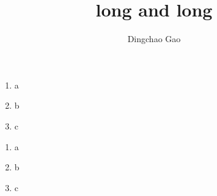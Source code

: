 \documentclass[18 pt]{beamer}
\title[short]{long and long}
\author[Gcc]{Dingchao Gao}
\institute[ISCAS]{Institute of Software Chinese Academy of Sciences}
\begin{document}
\begin{frame}[plain]
  \titlepage
\end{frame}


\begin{frame}
  \begin{enumerate}
    \item \LARGE a
    \item \LARGE b
    \item \LARGE c
  \end{enumerate}
\end{frame}

\begin{frame}
  \begin{enumerate}
    \item  a
    \item  b
    \item  c
  \end{enumerate}
\end{frame}
\end{document}
